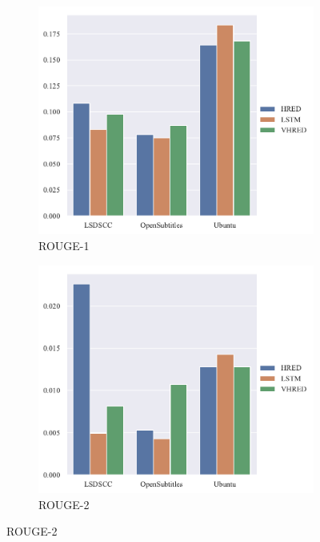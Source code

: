 \begin{figure}[H]
    \begin{subfigure}{0.4\linewidth}
        \centering
        \includegraphics[width=\linewidth]{figure/barplot/rouge_1/plot.pdf}
        \caption{ROUGE-1}
    \end{subfigure}%
    \begin{subfigure}{0.4\linewidth}
        \centering
        \includegraphics[width=\linewidth]{figure/barplot/rouge_2/plot.pdf}
        \caption{ROUGE-2}
    \end{subfigure}

\end{figure}
